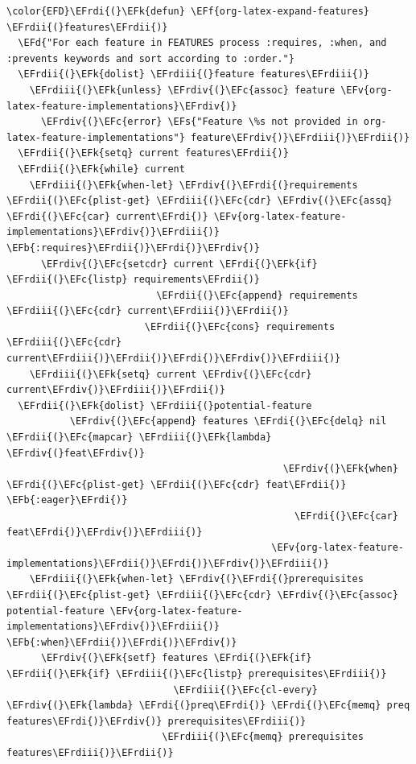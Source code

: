 \documentclass{scrartcl}
\newcommand{\EFk}[1]{\textcolor{EFk}{#1}} %
\newcommand{\EFd}[1]{\textcolor{EFd}{\textit{#1}}} %
\newcommand{\EFs}[1]{\textcolor{EFs}{#1}} %
\newcommand{\EFb}[1]{\textcolor{EFb}{#1}} %
\newcommand{\EFc}[1]{\textcolor{EFc}{#1}} %
\newcommand{\EFv}[1]{\textcolor{EFv}{#1}} %
\newcommand{\EFf}[1]{\textcolor{EFf}{#1}} %
\newcommand{\EFrdi}[1]{\textcolor{EFrdi}{#1}} %
\newcommand{\EFrdii}[1]{\textcolor{EFrdii}{#1}} %
\newcommand{\EFrdiii}[1]{\textcolor{EFrdiii}{#1}} %
\newcommand{\EFrdiv}[1]{\textcolor{EFrdiv}{#1}} %
\begin{document}
\begin{Code}
\begin{Verbatim}[]
\color{EFD}\EFrdi{(}\EFk{defun} \EFf{org-latex-expand-features} \EFrdii{(}features\EFrdii{)}
  \EFd{"For each feature in FEATURES process :requires, :when, and :prevents keywords and sort according to :order."}
  \EFrdii{(}\EFk{dolist} \EFrdiii{(}feature features\EFrdiii{)}
    \EFrdiii{(}\EFk{unless} \EFrdiv{(}\EFc{assoc} feature \EFv{org-latex-feature-implementations}\EFrdiv{)}
      \EFrdiv{(}\EFc{error} \EFs{"Feature \%s not provided in org-latex-feature-implementations"} feature\EFrdiv{)}\EFrdiii{)}\EFrdii{)}
  \EFrdii{(}\EFk{setq} current features\EFrdii{)}
  \EFrdii{(}\EFk{while} current
    \EFrdiii{(}\EFk{when-let} \EFrdiv{(}\EFrdi{(}requirements \EFrdii{(}\EFc{plist-get} \EFrdiii{(}\EFc{cdr} \EFrdiv{(}\EFc{assq} \EFrdi{(}\EFc{car} current\EFrdi{)} \EFv{org-latex-feature-implementations}\EFrdiv{)}\EFrdiii{)} \EFb{:requires}\EFrdii{)}\EFrdi{)}\EFrdiv{)}
      \EFrdiv{(}\EFc{setcdr} current \EFrdi{(}\EFk{if} \EFrdii{(}\EFc{listp} requirements\EFrdii{)}
                          \EFrdii{(}\EFc{append} requirements \EFrdiii{(}\EFc{cdr} current\EFrdiii{)}\EFrdii{)}
                        \EFrdii{(}\EFc{cons} requirements \EFrdiii{(}\EFc{cdr} current\EFrdiii{)}\EFrdii{)}\EFrdi{)}\EFrdiv{)}\EFrdiii{)}
    \EFrdiii{(}\EFk{setq} current \EFrdiv{(}\EFc{cdr} current\EFrdiv{)}\EFrdiii{)}\EFrdii{)}
  \EFrdii{(}\EFk{dolist} \EFrdiii{(}potential-feature
           \EFrdiv{(}\EFc{append} features \EFrdi{(}\EFc{delq} nil \EFrdii{(}\EFc{mapcar} \EFrdiii{(}\EFk{lambda} \EFrdiv{(}feat\EFrdiv{)}
                                                \EFrdiv{(}\EFk{when} \EFrdi{(}\EFc{plist-get} \EFrdii{(}\EFc{cdr} feat\EFrdii{)} \EFb{:eager}\EFrdi{)}
                                                  \EFrdi{(}\EFc{car} feat\EFrdi{)}\EFrdiv{)}\EFrdiii{)}
                                              \EFv{org-latex-feature-implementations}\EFrdii{)}\EFrdi{)}\EFrdiv{)}\EFrdiii{)}
    \EFrdiii{(}\EFk{when-let} \EFrdiv{(}\EFrdi{(}prerequisites \EFrdii{(}\EFc{plist-get} \EFrdiii{(}\EFc{cdr} \EFrdiv{(}\EFc{assoc} potential-feature \EFv{org-latex-feature-implementations}\EFrdiv{)}\EFrdiii{)} \EFb{:when}\EFrdii{)}\EFrdi{)}\EFrdiv{)}
      \EFrdiv{(}\EFk{setf} features \EFrdi{(}\EFk{if} \EFrdii{(}\EFk{if} \EFrdiii{(}\EFc{listp} prerequisites\EFrdiii{)}
                             \EFrdiii{(}\EFc{cl-every} \EFrdiv{(}\EFk{lambda} \EFrdi{(}preq\EFrdi{)} \EFrdi{(}\EFc{memq} preq features\EFrdi{)}\EFrdiv{)} prerequisites\EFrdiii{)}
                           \EFrdiii{(}\EFc{memq} prerequisites features\EFrdiii{)}\EFrdii{)}

\end{Verbatim}
\end{Code}
\end{document}

